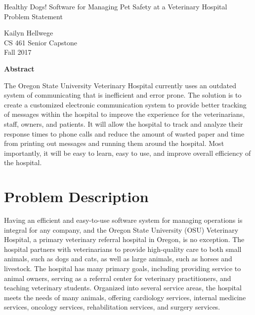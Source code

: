 \documentclass[letterpaper,10pt,draftclsnofoot,onecolumn]{article}
\begin{document}
\begin{center}
\begin{huge}
Healthy Dogs! Software for Managing Pet Safety at a Veterinary Hospital\\
Problem Statement \\
\end{huge}
\begin{large}
Kailyn Hellwege\\ 
CS 461 Senior Capstone \\ 
Fall 2017 \\ 
\end{large}
\end{center}

\begin{large}
\textbf{Abstract} \\
\end{large}
The Oregon State University Veterinary Hospital currently uses an outdated system of communicating that is inefficient and error prone. The solution is to create a customized electronic communication system to provide better tracking of messages within the hospital to improve the experience for the veterinarians, staff, owners, and patients. It will allow the hospital to track and analyze their response times to phone calls and reduce the amount of wasted paper and time from printing out messages and running them around the hospital. Most importantly, it will be easy to learn, easy to use, and improve overall efficiency of the hospital. 
\newline


\pagebreak


\section{Problem Description}

Having an efficient and easy-to-use software system for managing operations is integral for any company, and the Oregon State University (OSU) Veterinary Hospital, a primary veterinary referral hospital in Oregon, is no exception. The hospital partners with veterinarians to provide high-quality care to both small animals, such as dogs and cats, as well as large animals, such as horses and livestock. The hospital has many primary goals, including providing service to animal owners, serving as a referral center for veterinary practitioners, and teaching veterinary students. Organized into several service areas, the hospital meets the needs of many animals, offering cardiology services, internal medicine services, oncology services, rehabilitation services, and surgery services. 
\end{document}
